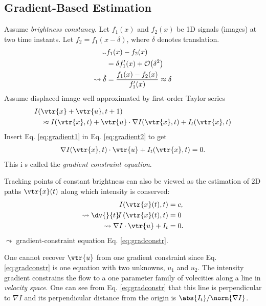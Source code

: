 \begin{compactdesc}
\section{Gradient-Based Estimation}
Assume \emph{brightness constancy}. Let $f_1(x)$ and $f_2(x)$ be 1D signals (images) at two time instants. Let $f_2=f_1(x-\delta)$, where $\delta$ denotes translation.
\begin{align}\scriptscriptstyle
	\mkern-36mu\leadsto &f_1(x)-f_2(x)\nonumber\\
	&=\delta f_1'(x)+\mathcal{O}\!\left( \delta^2 \right)\nonumber\\
	\leadsto \tilde{\delta} &=\frac{f_1(x)-f_2(x)}{f_1'(x)}\approx \delta
	\label{eq:gradient1}
\end{align}
Assume displaced image well approximated by first-order Taylor series
\begin{align}
		&I\!\left( \vtr{x}+\vtr{u},t+1 \right)
	\label{eq:gradient2}\\
		&\quad\approx I(\vtr{x},t)+\vtr{u}\cdot \nabla I(\vtr{x},t)+I_t(\vtr{x},t)\nonumber
\end{align}
Insert Eq. \ref{eq:gradient1} in Eq. \ref{eq:gradient2} to get
\begin{gather}
	\nabla I(\vtr{x},t)\cdot\vtr{u}+I_t(\vtr{x},t)=0.
	\label{eq:gradconstr}
\end{gather}
This i s called the \emph{gradient constraint equation}.
\item[\lp{Intensity Conservation}] Tracking points of constant brightness can also be viewed as the estimation of 2D paths $\vtr{x}(t)$ along which intensity is conserved:
	\begin{align}
		I\!\left( \vtr{x}(t),t \right)&=c,\nonumber\\
		\leadsto\dv{}{t}\!I\left( \vtr{x}(t),t \right)&=0\nonumber\\
		\leadsto\nabla I\cdot \vtr{u}+I_t&=0.
		\label{eq:brightnessconst3}
	\end{align}
	$\leadsto$ gradient-constraint equation Eq. \ref{eq:gradconstr}.
\item[\lp{Least-Squares estimation}] One cannot recover $\vtr{u}$ from one gradient constraint since Eq. \ref{eq:gradconstr}  is one equation with two unknowns, $u_1$ and $u_2$. The intensity gradient constrains the flow to a one parameter family of volecities along a line in \emph{velocity space}. One can see from Eq. \ref{eq:gradconstr} that this line is perpendicular to $\nabla I$ and its perpendicular distance from the origin is $\abs{I_t}/\norm{\nabla I}$.


\end{compactdesc}
